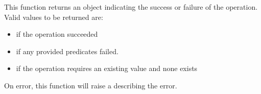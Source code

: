 This function returns an object indicating the success or failure of the
operation.  Valid values to be returned are:

\begin{itemize}[noitemsep]
\item {} if the operation succeeded
\item {} if any provided predicates failed.
\item {} if the operation requires an existing value and none exists
\end{itemize}

On error, this function will raise a  describing
the error.
